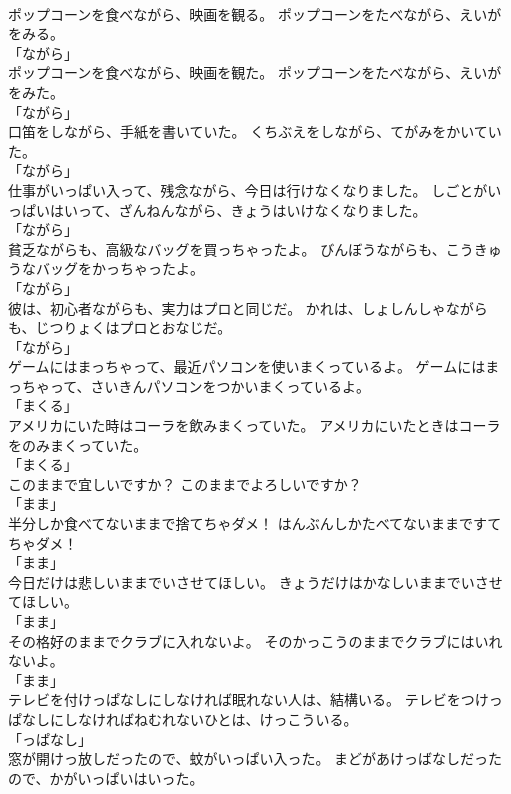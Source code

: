 \documentclass[8pt]{extreport}
\begin{document}
\begin{CJK}{UTF8}{min}
\\	ポップコーンを食べながら、映画を観る。	ポップコーンをたべながら、えいがをみる。	
\\	「ながら」 
\\	ポップコーンを食べながら、映画を観た。	ポップコーンをたべながら、えいがをみた。	
\\	「ながら」 
\\	口笛をしながら、手紙を書いていた。	くちぶえをしながら、てがみをかいていた。	
\\	「ながら」 
\\	仕事がいっぱい入って、残念ながら、今日は行けなくなりました。	しごとがいっぱいはいって、ざんねんながら、きょうはいけなくなりました。	
\\	「ながら」 
\\	貧乏ながらも、高級なバッグを買っちゃったよ。	びんぼうながらも、こうきゅうなバッグをかっちゃったよ。	
\\	「ながら」 
\\	彼は、初心者ながらも、実力はプロと同じだ。	かれは、しょしんしゃながらも、じつりょくはプロとおなじだ。	
\\	「ながら」 
\\	ゲームにはまっちゃって、最近パソコンを使いまくっているよ。	ゲームにはまっちゃって、さいきんパソコンをつかいまくっているよ。	
\\	「まくる」	
\\	アメリカにいた時はコーラを飲みまくっていた。	アメリカにいたときはコーラをのみまくっていた。	
\\	「まくる」	
\\	このままで宜しいですか？	このままでよろしいですか？	
\\	「まま」 
\\	半分しか食べてないままで捨てちゃダメ！	はんぶんしかたべてないままですてちゃダメ！	
\\	「まま」 
\\	今日だけは悲しいままでいさせてほしい。	きょうだけはかなしいままでいさせてほしい。	
\\	「まま」 
\\	その格好のままでクラブに入れないよ。	そのかっこうのままでクラブにはいれないよ。	
\\	「まま」 
\\	テレビを付けっぱなしにしなければ眠れない人は、結構いる。	テレビをつけっぱなしにしなければねむれないひとは、けっこういる。	
\\	「っぱなし」 
\\	窓が開けっ放しだったので、蚊がいっぱい入った。	まどがあけっばなしだったので、かがいっぱいはいった。	

\end{CJK}
\end{document}
